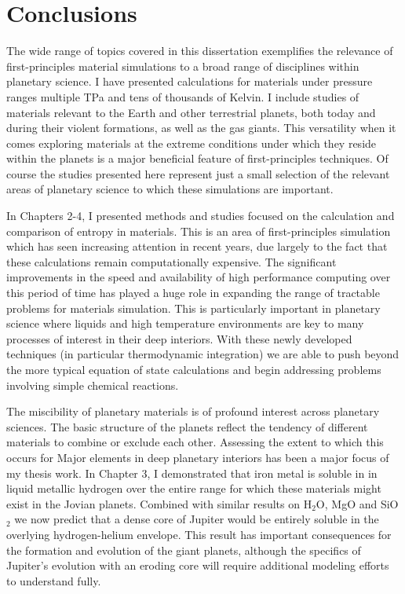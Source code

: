 \chapter{Conclusions}\label{chap9}

The wide range of topics covered in this dissertation exemplifies the relevance of
first-principles material simulations to a broad range of disciplines within
planetary science. I have presented calculations for materials under pressure ranges
multiple TPa and tens of thousands of Kelvin. I include studies of materials relevant
to the Earth and other terrestrial planets, both today and during their violent
formations, as well as the gas giants. This versatility when it comes exploring
materials at the extreme conditions under which they reside within the planets is a
major beneficial feature of first-principles techniques. Of course the studies
presented here represent just a small selection of the relevant areas of planetary
science to which these simulations are important.

In Chapters 2-4, I presented methods and studies focused on the calculation and
comparison of entropy in materials. This is an area of first-principles simulation
which has seen increasing attention in recent years, due largely to the fact that
these calculations remain computationally expensive. The significant improvements in
the speed and availability of high performance computing over this period of time has
played a huge role in expanding the range of tractable problems for materials
simulation. This is particularly important in planetary science where liquids and
high temperature environments are key to many processes of interest in their deep
interiors. With these newly developed techniques (in particular thermodynamic
integration) we are able to push beyond the more typical equation of state
calculations and begin addressing problems involving simple chemical reactions.

The miscibility of planetary materials is of profound interest across planetary
sciences. The basic structure of the planets reflect the tendency of different
materials to combine or exclude each other. Assessing the extent to which this occurs
for Major elements in deep planetary interiors has been a major focus of my thesis
work. In Chapter 3, I demonstrated that iron metal is soluble in in liquid metallic
hydrogen over the entire range for which these materials might exist in the Jovian
planets.  Combined with similar results on H$_2$O, MgO and SiO$_2$
\citep{Wilson2012a,wilson12b,Gonzalez2013} we now predict that a dense core of Jupiter
would be entirely soluble in the overlying hydrogen-helium envelope. This result has
important consequences for the formation and evolution of the giant planets, although
the specifics of Jupiter's evolution with an eroding core will require additional
modeling efforts to understand fully. 

